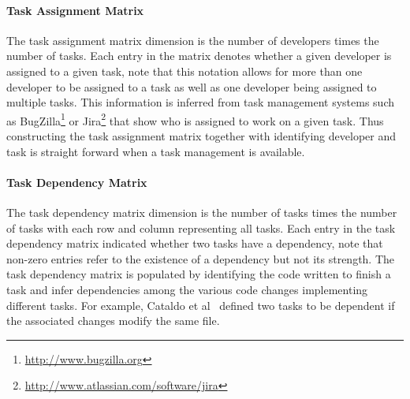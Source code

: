 \paragraph{Task Assignment Matrix}
The task assignment matrix dimension is the number of developers times the number of tasks.
Each entry in the matrix denotes whether a given developer is assigned to a given task, note that this notation allows for more than one developer to be assigned to a task as well as one developer being assigned to multiple tasks.
This information is inferred from task management systems such as BugZilla\footnote{\url{http://www.bugzilla.org}} or Jira\footnote{\url{http://www.atlassian.com/software/jira}} that show who is assigned to work on a given task.
Thus constructing the task assignment matrix together with identifying developer and task is straight forward when a task management is available.

\paragraph{Task Dependency Matrix}
The task dependency matrix dimension is the number of tasks times the number of tasks with each row and column representing all tasks.
Each entry in the task dependency matrix indicated whether two tasks have a dependency, note that non-zero entries refer to the existence of a dependency but not its strength.
The task dependency matrix is populated by identifying the code written to finish a task and infer dependencies among the various code changes implementing different tasks.
For example, Cataldo et al~\cite{cataldo:cscw:2006} defined two tasks to be dependent if the associated changes modify the same file. 

